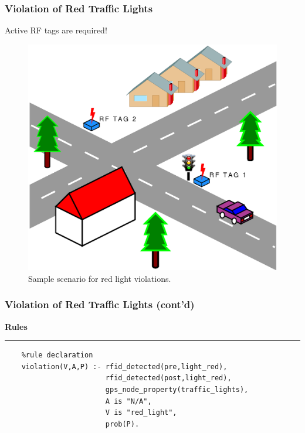 \documentclass{beamer}
\newenvironment{mylisting}
{\begin{list}{}{\setlength{\leftmargin}{1em}}\item\scriptsize\bfseries}
{\end{list}}
\begin{document}
\begin{frame}[fragile]
	\frametitle{Violation of Red Traffic Lights}
	Active RF tags are required!
	\begin{figure}[ht]
	\begin{center}
	\includegraphics[width=.5\paperwidth]{../img/rfid3.eps}
	\caption{Sample scenario for red light violations.}
	\label{fig:rfid3}
	\end{center}
	\end{figure}
\end{frame}

\begin{frame}[fragile]
	\frametitle{Violation of Red Traffic Lights (cont'd)}
	\begin{mylisting}
	Rules
	\vspace*{2px}\hrule	
	\begin{verbatim}
	%rule declaration
	violation(V,A,P) :- rfid_detected(pre,light_red),
	                    rfid_detected(post,light_red),
	                    gps_node_property(traffic_lights),
	                    A is "N/A",
	                    V is "red_light",
	                    prob(P).
	\end{verbatim}
	\end{mylisting}	
\end{frame}
\end{document}
